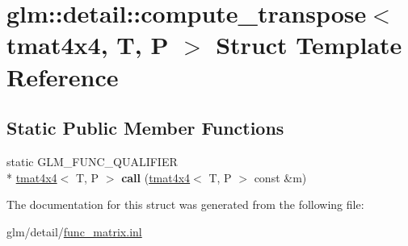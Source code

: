 \hypertarget{structglm_1_1detail_1_1compute__transpose_3_01tmat4x4_00_01T_00_01P_01_4}{\section{glm\-:\-:detail\-:\-:compute\-\_\-transpose$<$ tmat4x4, T, P $>$ Struct Template Reference}
\label{structglm_1_1detail_1_1compute__transpose_3_01tmat4x4_00_01T_00_01P_01_4}
}
\subsection*{Static Public Member Functions}
\begin{DoxyCompactItemize}
\item 
\hypertarget{structglm_1_1detail_1_1compute__transpose_3_01tmat4x4_00_01T_00_01P_01_4_a9f85b05d5a5d934934c923f8ac9f0663}{static G\-L\-M\-\_\-\-F\-U\-N\-C\-\_\-\-Q\-U\-A\-L\-I\-F\-I\-E\-R \\*
\hyperlink{structglm_1_1tmat4x4}{tmat4x4}$<$ T, P $>$ {\bfseries call} (\hyperlink{structglm_1_1tmat4x4}{tmat4x4}$<$ T, P $>$ const \&m)}\label{structglm_1_1detail_1_1compute__transpose_3_01tmat4x4_00_01T_00_01P_01_4_a9f85b05d5a5d934934c923f8ac9f0663}

\end{DoxyCompactItemize}


The documentation for this struct was generated from the following file\-:\begin{DoxyCompactItemize}
\item 
glm/detail/\hyperlink{func__matrix_8inl}{func\-\_\-matrix.\-inl}\end{DoxyCompactItemize}
